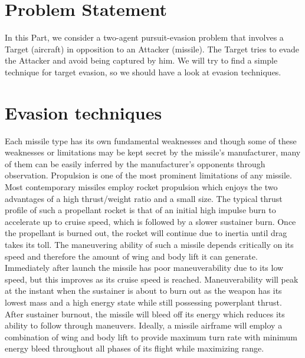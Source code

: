 \label{introTA}
\section{Problem Statement}
In this Part, we consider a two-agent pursuit-evasion problem that involves  a Target (aircraft) in opposition to an Attacker (missile). The Target tries to evade the Attacker and avoid being captured by him. We will try to find a simple technique for target evasion, so we should have a look at evasion techniques.

\section{Evasion techniques}

Each missile type has its own fundamental weaknesses and though some of these weaknesses or limitations may be kept secret by the missile’s manufacturer, many of them can be easily inferred by the manufacturer's opponents through observation. Propulsion is one of the most prominent limitations of any missile. Most contemporary missiles employ rocket propulsion which enjoys the two advantages of a high thrust/weight ratio and a small size. The typical thrust profile of such a propellant rocket is that of an initial high impulse burn to accelerate up to cruise speed, which is followed by a slower sustainer burn. Once the propellant is burned out, the rocket will continue due to inertia until drag takes its toll. The maneuvering ability of such a missile depends critically on its speed and therefore the amount of wing and body lift it can generate. Immediately after launch the missile has poor maneuverability due to its low speed, but this improves as its cruise speed is reached. Maneuverability will peak at the instant when the sustainer is about to burn out as the weapon has its lowest mass and a high energy state while still possessing powerplant thrust. After sustainer burnout, the missile will bleed off its energy which reduces its ability to follow through maneuvers. Ideally, a missile airframe will employ a combination of wing and body lift to provide maximum turn rate with minimum energy bleed throughout all phases of its flight while maximizing range.\\


